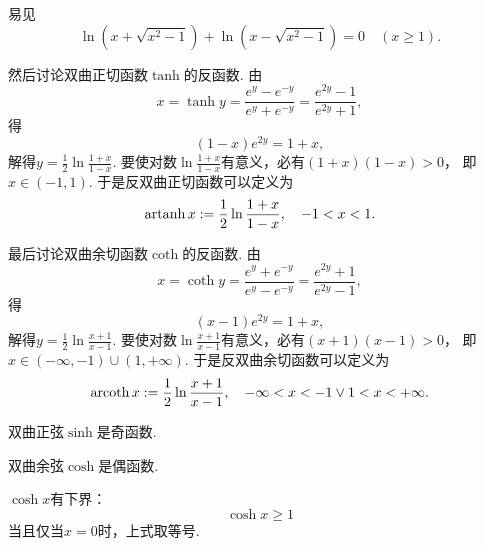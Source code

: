 易见\[
	\ln(x+\sqrt{x^2-1}) + \ln(x-\sqrt{x^2-1}) = 0
	\quad(x\geq1).
\]

然后讨论双曲正切函数\(\tanh\)的反函数.
由\[
	x = \tanh y
	= \frac{e^y-e^{-y}}{e^y+e^{-y}}
	= \frac{e^{2y}-1}{e^{2y}+1},
\]得\[
	(1-x) e^{2y} = 1+x,
\]
解得\(y = \frac12 \ln\frac{1+x}{1-x}\).
要使对数\(\ln\frac{1+x}{1-x}\)有意义，必有\((1+x)(1-x)>0\)，
即\(x\in(-1,1)\).
于是反双曲正切函数可以定义为\[
	\operatorname{artanh} x
	:=
	\frac12 \ln\frac{1 + x}{1 - x},
	\quad -1<x<1.
\]

最后讨论双曲余切函数\(\coth\)的反函数.
由\[
	x = \coth y
	= \frac{e^y+e^{-y}}{e^y-e^{-y}}
	= \frac{e^{2y}+1}{e^{2y}-1},
\]得\[
	(x-1) e^{2y} = 1+x,
\]
解得\(y = \frac12 \ln\frac{x+1}{x-1}\).
要使对数\(\ln\frac{x+1}{x-1}\)有意义，必有\((x+1)(x-1)>0\)，
即\(x\in(-\infty,-1)\cup(1,+\infty)\).
于是反双曲余切函数可以定义为\[
	\operatorname{arcoth} x
	:=
	\frac12 \ln\frac{x + 1}{x - 1},
	\quad -\infty<x<-1\lor1<x<+\infty.
\]

\begin{property}
双曲正弦\(\sinh\)是奇函数.
\end{property}

\begin{property}
双曲余弦\(\cosh\)是偶函数.
\end{property}

\begin{property}
\(\cosh x\)有下界：\[
	\cosh x \geq 1
\]
当且仅当\(x=0\)时，上式取等号.
\end{property}

